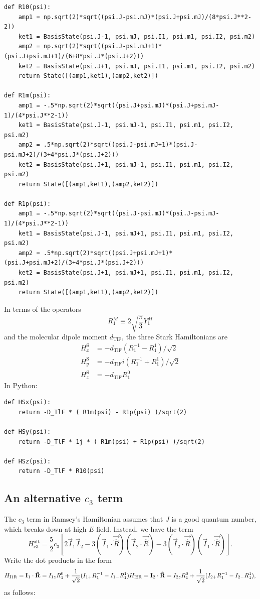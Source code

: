 \begin{lstlisting}
def R10(psi):
    amp1 = np.sqrt(2)*sqrt((psi.J-psi.mJ)*(psi.J+psi.mJ)/(8*psi.J**2-2))
    ket1 = BasisState(psi.J-1, psi.mJ, psi.I1, psi.m1, psi.I2, psi.m2)
    amp2 = np.sqrt(2)*sqrt((psi.J-psi.mJ+1)*(psi.J+psi.mJ+1)/(6+8*psi.J*(psi.J+2)))
    ket2 = BasisState(psi.J+1, psi.mJ, psi.I1, psi.m1, psi.I2, psi.m2)
    return State([(amp1,ket1),(amp2,ket2)])

def R1m(psi):
    amp1 = -.5*np.sqrt(2)*sqrt((psi.J+psi.mJ)*(psi.J+psi.mJ-1)/(4*psi.J**2-1))
    ket1 = BasisState(psi.J-1, psi.mJ-1, psi.I1, psi.m1, psi.I2, psi.m2)
    amp2 = .5*np.sqrt(2)*sqrt((psi.J-psi.mJ+1)*(psi.J-psi.mJ+2)/(3+4*psi.J*(psi.J+2)))
    ket2 = BasisState(psi.J+1, psi.mJ-1, psi.I1, psi.m1, psi.I2, psi.m2)
    return State([(amp1,ket1),(amp2,ket2)])

def R1p(psi):
    amp1 = -.5*np.sqrt(2)*sqrt((psi.J-psi.mJ)*(psi.J-psi.mJ-1)/(4*psi.J**2-1))
    ket1 = BasisState(psi.J-1, psi.mJ+1, psi.I1, psi.m1, psi.I2, psi.m2)
    amp2 = .5*np.sqrt(2)*sqrt((psi.J+psi.mJ+1)*(psi.J+psi.mJ+2)/(3+4*psi.J*(psi.J+2)))
    ket2 = BasisState(psi.J+1, psi.mJ+1, psi.I1, psi.m1, psi.I2, psi.m2)
    return State([(amp1,ket1),(amp2,ket2)])
\end{lstlisting}

In terms of the operators
%
$$
R^M_1\equiv2\sqrt{\frac{\pi}{3}}Y_1^M
$$
%
and the molecular dipole moment $d_\text{TlF}$, the three Stark Hamiltonians are
%
\begin{align*}
H^\text{S}_x&=-d_\text{TlF}(R^{-1}_1-R^1_1)/\sqrt{2}\\
H^\text{S}_y&=-d_\text{TlF}i(R^{-1}_1+R^1_1)/\sqrt{2}\\
H^\text{S}_z&=-d_\text{TlF}R^0_1
\end{align*}
%
In Python:

\begin{lstlisting}
def HSx(psi):
    return -D_TlF * ( R1m(psi) - R1p(psi) )/sqrt(2)

def HSy(psi):
    return -D_TlF * 1j * ( R1m(psi) + R1p(psi) )/sqrt(2)

def HSz(psi):
    return -D_TlF * R10(psi)
\end{lstlisting}

\subsection{An alternative $c_3$ term}

The $c_3$ term in Ramsey's Hamiltonian assumes that $J$ is a good quantum
number, which breaks down at high $E$ field. Instead, we have the term
%
$$
H_\text{c3}^\text{alt}=\frac{5}{2}c_3\left[
2\vec I_1\vec I_2
-3(\vec I_1\cdot\vec{\hat{R}})(\vec I_2\cdot\vec{\hat{R}})
-3(\vec I_2\cdot\vec{\hat{R}})(\vec I_1\cdot\vec{\hat{R}})
\right].
$$
%
Write the dot products in the form
%
$$
H_\text{I1R}=\vec I_1\cdot\vec{\hat{R}}=I_{1z}R_1^0+\frac{1}{\sqrt2}(I_{1+}R_1^{-1}-I_{1-}R_1^{1})\\
H_\text{I2R}=\vec I_2\cdot\vec{\hat{R}}=I_{2z}R_1^0+\frac{1}{\sqrt2}(I_{2+}R_1^{-1}-I_{2-}R_1^{1}),
$$
%
as follows:

